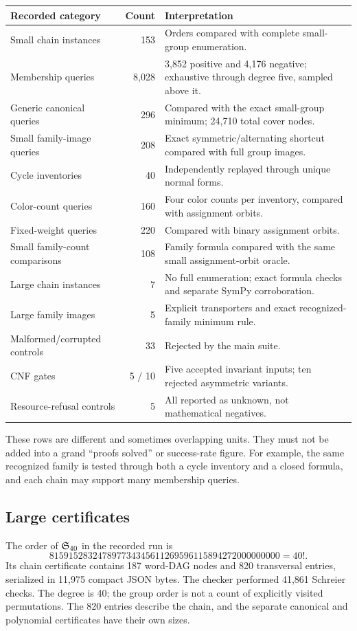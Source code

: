 \begin{tabularx}{\textwidth}{@{}YrY@{}}
\toprule
Recorded category & Count & Interpretation\\
\midrule
Small chain instances & 153 & Orders compared with complete small-group enumeration.\\
Membership queries & 8,028 & 3,852 positive and 4,176 negative; exhaustive through degree five, sampled above it.\\
Generic canonical queries & 296 & Compared with the exact small-group minimum; 24,710 total cover nodes.\\
Small family-image queries & 208 & Exact symmetric/alternating shortcut compared with full group images.\\
Cycle inventories & 40 & Independently replayed through unique normal forms.\\
Color-count queries & 160 & Four color counts per inventory, compared with assignment orbits.\\
Fixed-weight queries & 220 & Compared with binary assignment orbits.\\
Small family-count comparisons & 108 & Family formula compared with the same small assignment-orbit oracle.\\
Large chain instances & 7 & No full enumeration; exact formula checks and separate SymPy corroboration.\\
Large family images & 5 & Explicit transporters and exact recognized-family minimum rule.\\
Malformed/corrupted controls & 33 & Rejected by the main suite.\\
CNF gates & 5 / 10 & Five accepted invariant inputs; ten rejected asymmetric variants.\\
Resource-refusal controls & 5 & All reported as unknown, not mathematical negatives.\\
\bottomrule
\end{tabularx}

These rows are different and sometimes overlapping units. They must not be added into a grand ``proofs solved'' or success-rate figure. For example, the same recognized family is tested through both a cycle inventory and a closed formula, and each chain may support many membership queries.

\subsection{Large certificates}

The order of $\mathfrak S_{40}$ in the recorded run is
\[
  815915283247897734345611269596115894272000000000=40!.
\]
Its chain certificate contains 187 word-DAG nodes and 820 transversal entries, serialized in 11,975 compact JSON bytes. The checker performed 41,861 Schreier checks. The degree is 40; the group order is not a count of explicitly visited permutations. The 820 entries describe the chain, and the separate canonical and polynomial certificates have their own sizes.

